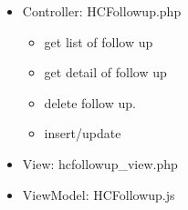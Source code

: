 \documentclass[letterpaper,10pt,english,openany,oneside]{sphinxmanual}
\begin{document}
\begin{sphinxVerbatim}[commandchars=\\\{\}]
               
  
               
\end{sphinxVerbatim}
\begin{itemize}
\item {} 
\sphinxAtStartPar
Controller: HCFollowup.php
\begin{itemize}
\item {} 
\sphinxAtStartPar
{} get list of follow up

\item {} 
\sphinxAtStartPar
{} get detail of follow up

\item {} 
\sphinxAtStartPar
{} delete follow up.

\item {} 
\sphinxAtStartPar
{} insert/update

\end{itemize}

\begin{sphinxVerbatim}[commandchars=\\\{\}]
    
   
 
\end{sphinxVerbatim}

\item {} 
\sphinxAtStartPar
View: hcfollowup\_view.php

\item {} 
\sphinxAtStartPar
ViewModel: HCFollowup.js

\end{itemize}
\end{document}
